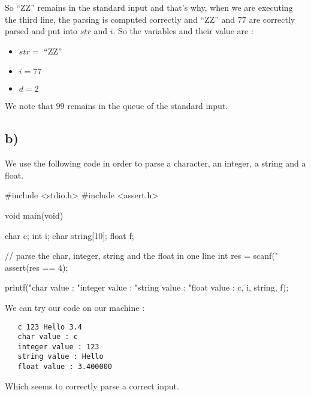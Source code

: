 \documentclass[a4paper,11pt]{report}
\begin{document}
So ``ZZ'' remains in the standard input and that's why, when we are executing
the third line, the parsing is computed correctly and ``ZZ'' and $77$ are
correctly parsed and put into $str$ and $i$. So the variables and their value
are :

\begin{itemize}
\item $str =$ ``ZZ''
\item $i = 77$
\item $d = 2$
\end{itemize}

We note that $99$ remains in the queue of the standard input.

\subsection*{b)}

We use the following code in order to parse a character, an integer, a string
and a float.

\begin{ccode}
#include <stdio.h>
#include <assert.h>

void main(void)
{
    char c;
    int i;
    char string[10];
    float f;

    // parse the char, integer, string and the float in one line
    int res = scanf("%
    assert(res == 4);

    printf("char value : %
           "integer value : %
           "string value : %
           "float value : %
           c, i, string, f);
}
\end{ccode}

We can try our code on our machine :

\begin{verbatim}
   c 123 Hello 3.4
   char value : c
   integer value : 123
   string value : Hello
   float value : 3.400000
\end{verbatim}

Which seems to correctly parse a correct input.
\end{document}
